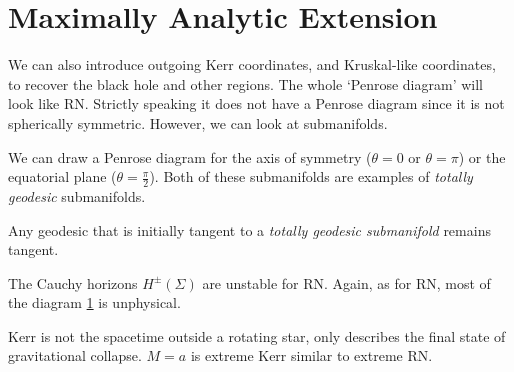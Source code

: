 \section{Maximally Analytic Extension}%
\label{sec:maximally_analytic_extension}

We can also introduce outgoing Kerr coordinates, and Kruskal-like coordinates, to recover the black hole and other regions.
The whole `Penrose diagram' will look like RN.
Strictly speaking it does not have a Penrose diagram since it is not spherically symmetric.
However, we can look at submanifolds.

We can draw a Penrose diagram for the axis of symmetry ($\theta = 0$ or $\theta = \pi$) or the equatorial plane ($\theta = \frac{\pi}{2}$).
Both of these submanifolds are examples of \emph{totally geodesic} submanifolds.
\begin{definition}
  Any geodesic that is initially tangent to a \emph{totally geodesic submanifold} remains tangent.
\end{definition}
\begin{figure}[tbhp]
  \centering
  \def\svgwidth{0.4\columnwidth}
  
  \caption{}
  \label{fig:l15f1}
\end{figure}

The Cauchy horizons $H^{\pm}(\Sigma)$ are unstable for RN. Again, as for RN, most of the diagram \ref{fig:l15f1} is unphysical.

Kerr is not the spacetime outside a rotating star, only describes the final state of gravitational collapse. 
$M = a$ is extreme Kerr similar to extreme RN.

